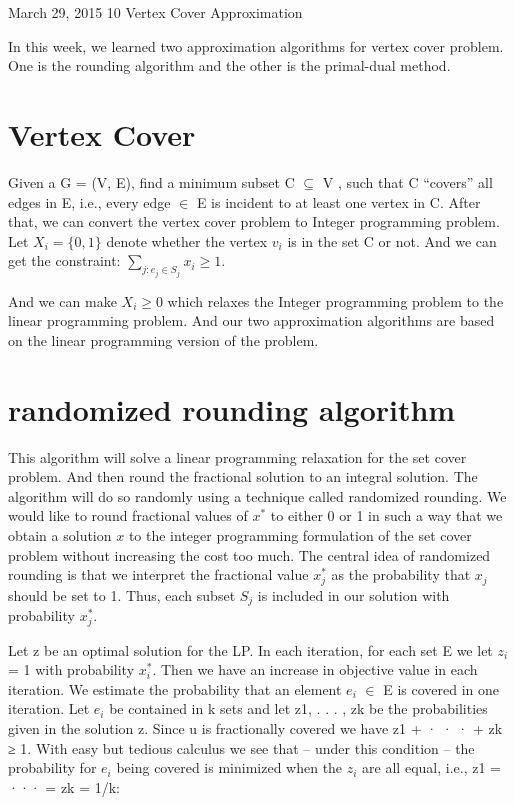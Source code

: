 \documentclass[usletter]{article}
\begin{document}
           {March 29, 2015}                          %
           {10}                                       %
           {Vertex Cover Approximation}  %

\noindent
In this week, we learned two approximation algorithms for vertex cover problem. One is the rounding algorithm and the other is the primal-dual method. 
\section{Vertex Cover}
Given a G = (V, E), find a minimum subset C $\subseteq$ V , such that C “covers” all edges in E, i.e., every edge $\in$ E is incident to at least one vertex in C. After that, we can convert the vertex cover problem to Integer programming problem. Let $X_{i} = \{0, 1\}$ denote whether the vertex $v_{i}$ is in the set C or not.
And we can get the constraint:  $\sum_{j: e_j \in S_j}{x_i} \ge 1$.

And we can make $X_{i} \ge 0$ which relaxes the Integer programming problem to the linear programming problem. And our two approximation algorithms are based on the linear programming version of the problem.

\section{randomized rounding algorithm}
This algorithm will solve a linear programming relaxation for the set cover problem. And then round the fractional solution to an integral solution. The algorithm will do so randomly using a technique called randomized rounding. We would like to round fractional values of $x^*$ to either 0 or 1 in such a way that we obtain a solution $x$ to the integer programming formulation of the set cover problem without increasing the cost too much. The central idea of randomized rounding is that we interpret the fractional value $x_j^*$ as the probability that $x_j$ should be set to 1. Thus, each subset $S_j$ is included in our solution with probability $x^*_j$.

Let z be an optimal solution for the LP. In each iteration, for each set E we let $z_i$ = 1 with probability $x^*_i$. Then we have an increase in objective value in each iteration.
We estimate the probability that an element $e_i$ $\in$ E is covered in one iteration. Let $e_i$ be contained in k sets and let z1, . . . , zk be the probabilities given in the solution z. Since u is fractionally covered we have z1 + · · · + zk ≥ 1. With easy but tedious calculus we see that – under this condition – the probability for $e_i$ being covered is minimized when the $z_i$ are all equal, i.e., z1 = ··· = zk = 1/k:
\end{document}
